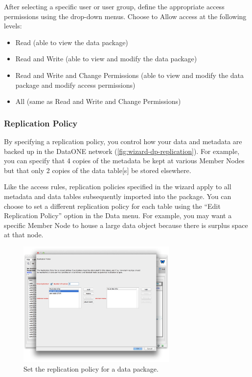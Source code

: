 After selecting a specific user or user group, define the appropriate
access permissions using the drop-down menus. Choose to Allow access at 
the following levels:
\begin{itemize}
  \setlength{\parskip}{1pt}
  \item Read (able to view the data package)
  \item Read and Write (able to view and modify the data package)
  \item Read and Write and Change Permissions (able to view and modify
    the data package and modify access permissions)
  \item All  (same as Read and Write and Change Permissions)
\end{itemize}

\subsubsection{Replication Policy} \label{sec:wizard-dp-replication}

By specifying a replication policy, you control how your data
and metadata are backed up in the DataONE network (\autoref{fig:wizard-dp-replication}). 
For example, you can specify that 4 copies of the metadata be kept 
at various Member Nodes but that only 2 copies of the data table[s] be stored elsewhere.

Like the access rules, replication policies specified in the wizard apply 
to all metadata and data tables subsequently imported into the package. 
You can choose to set a different replication policy for each table using 
the ``Edit Replication Policy'' option in
the Data menu. For example, you may want a specific Member Node to house a 
large data object because there is surplus space at that node.

\begin{figure}
  \centering
    \includegraphics[width=0.7\textwidth]{images/wizard-dp-replication.jpg}
  \caption{Set the replication policy for a data package.}
  \label{fig:wizard-dp-replication}
\end{figure}

